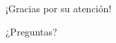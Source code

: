 \documentclass[aspectratio=169,11pt]{beamer}
\newcommand{\kB}{k_{B}}
\newcommand{\fig}[1]{{\scriptsize\color{gris}#1}}
\begin{document}
\begin{frame}{¡Gracias por su atención!}
      
      \begin{block}{}
        \centering
        \Large ¿Preguntas?
      \end{block}
\end{frame}
\end{document}
